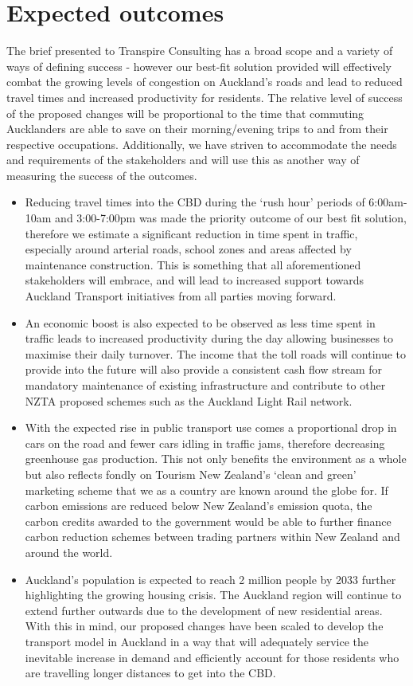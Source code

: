 \documentclass[twoside, a4paper, 11pt]{article}
\begin{document}
\section{Expected outcomes}
The brief presented to Transpire Consulting has a broad scope and a variety of ways of defining success - however our best-fit solution provided will effectively combat the growing levels of congestion on Auckland's roads and lead to reduced travel times and increased productivity for residents. The relative level of success of the proposed changes will be proportional to the time that commuting Aucklanders are able to save on their morning/evening trips to and from their respective occupations. Additionally, we have striven to accommodate the needs and requirements of the stakeholders and will use this as another way of measuring the success of the outcomes.
\begin{itemize}
\item Reducing travel times into the CBD during the `rush hour' periods of 6:00am-10am and 3:00-7:00pm was made the priority outcome of our best fit solution, therefore we estimate a significant reduction in time spent in traffic, especially around arterial roads, school zones and areas affected by maintenance construction. This is something that all aforementioned stakeholders will embrace, and will lead to increased support towards Auckland Transport initiatives from all parties moving forward.
\item An economic boost is also expected to be observed as less time spent in traffic leads to increased productivity during the day allowing businesses to maximise their daily turnover. The income that the toll roads will continue to provide into the future will also provide a consistent cash flow stream for mandatory maintenance of existing infrastructure and contribute to other NZTA proposed schemes such as the Auckland Light Rail network.
\item With the expected rise in public transport use comes a proportional drop in cars on the road and fewer cars idling in traffic jams, therefore decreasing greenhouse gas production. This not only benefits the environment as a whole but also reflects fondly on Tourism New Zealand's `clean and green' marketing scheme that we as a country are known around the globe for. If carbon emissions are reduced below New Zealand's emission quota, the carbon credits awarded to the government would be able to further finance carbon reduction schemes between trading partners within New Zealand and around the world.
\item Auckland's population is expected to reach 2 million people by 2033 \citep{stats17} further highlighting the growing housing crisis. The Auckland region will continue to extend further outwards due to the development of new residential areas. With this in mind, our proposed changes have been scaled to develop the transport model in Auckland in a way that will adequately service the inevitable  increase in demand and efficiently account for those residents who are travelling longer distances to get into the CBD.

\end{itemize}
\end{document}
